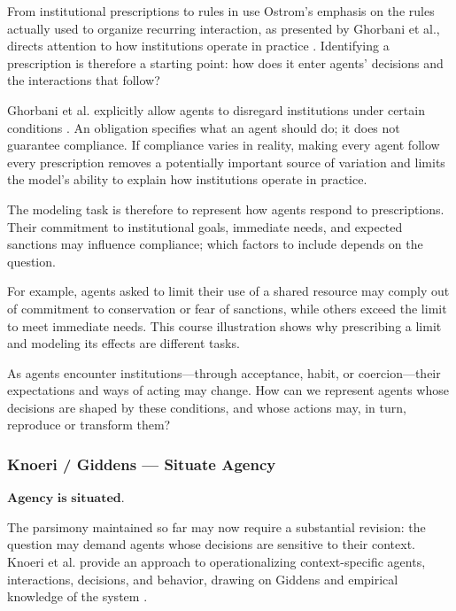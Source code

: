\documentclass[11pt,a4paper]{article}
\newenvironment{fitdisplay}{\par\medskip\noindent\begin{lrbox}{\displaybox}$\displaystyle}{%
$\end{lrbox}\makebox[\linewidth][c]{\ifdim\wd\displaybox>\linewidth\resizebox{\linewidth}{!}{\usebox{\displaybox}}\else\usebox{\displaybox}\fi}\par\medskip}
\begin{document}
\begin{principle}{From institutional prescriptions to rules in use}
Ostrom's emphasis on the rules actually used to organize recurring interaction, as presented by Ghorbani et al., directs attention to how institutions operate in practice \cite[sec.~2.3]{ghorbani}. Identifying a prescription is therefore a starting point: how does it enter agents' decisions and the interactions that follow?

Ghorbani et al. explicitly allow agents to disregard institutions under certain conditions \cite[sec.~2.4]{ghorbani}. An obligation specifies what an agent should do; it does not guarantee compliance. If compliance varies in reality, making every agent follow every prescription removes a potentially important source of variation and limits the model's ability to explain how institutions operate in practice.
\end{principle}

The modeling task is therefore to represent how agents respond to prescriptions. Their commitment to institutional goals, immediate needs, and expected sanctions may influence compliance; which factors to include depends on the question.

For example, agents asked to limit their use of a shared resource may comply out of commitment to conservation or fear of sanctions, while others exceed the limit to meet immediate needs. This course illustration shows why prescribing a limit and modeling its effects are different tasks.

As agents encounter institutions---through acceptance, habit, or coercion---their expectations and ways of acting may change. How can we represent agents whose decisions are shaped by these conditions, and whose actions may, in turn, reproduce or transform them?

\subsubsection{Knoeri / Giddens --- Situate Agency}

\begin{fitdisplay}
\boxed{\textbf{Agency is situated.}}
\end{fitdisplay}

The parsimony maintained so far may now require a substantial revision: the question may demand agents whose decisions are sensitive to their context. Knoeri et al. provide an approach to operationalizing context-specific agents, interactions, decisions, and behavior, drawing on Giddens and empirical knowledge of the system \cite{knoeri}.
\end{document}
